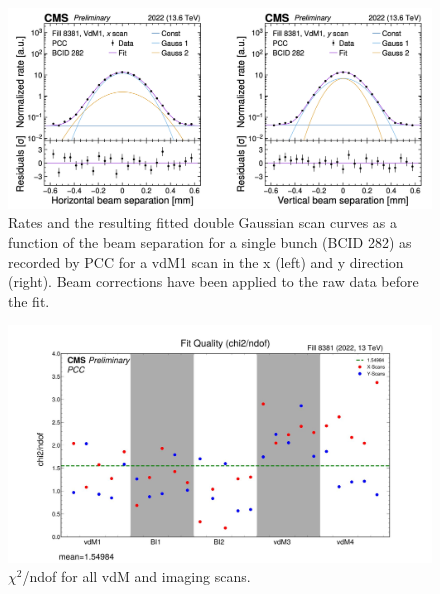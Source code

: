 \begin{figure}[!htp]
\centering
\includegraphics[width=1\textwidth]{ashish_thesis/2022_PCC_vdM_fit_new.png}
\caption[2022 PCC vdM fit]{%
  Rates and the resulting fitted double Gaussian scan curves as a function of the beam separation for a single bunch (BCID 282) as recorded by PCC for a vdM1 scan in the x (left) and y direction (right). Beam corrections have been applied to the raw data before the fit.
}
\label{fig:period_bound_50}
\end{figure}

\begin{figure}[!htp]
\centering
\includegraphics[width=1\textwidth]{ashish_thesis/DGConst_chi2.jpeg}
\caption{%
  $\chi^2$/ndof for all vdM and imaging scans.
}
\label{fig:period_bound_510}
\end{figure}



